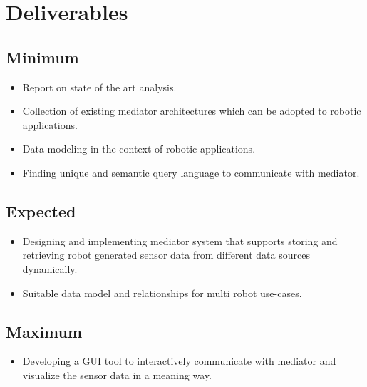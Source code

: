 \documentclass[12pt]{article}
\begin{document}

\newpage
\section{Deliverables}
\subsection{Minimum}
\begin{itemize}
\item Report on state of the art analysis.
\item Collection of existing mediator architectures which can be adopted to robotic applications.
\item Data modeling in the context of robotic applications.
\item Finding unique and semantic query language to communicate with mediator.
\end{itemize}
\subsection{Expected}
\begin{itemize}
\item Designing and implementing mediator system that supports storing and retrieving robot generated sensor data from different data sources dynamically.
\item Suitable data model and relationships for multi robot use-cases.
\end{itemize}
\subsection{Maximum}
\begin{itemize}
\item Developing a GUI tool to interactively communicate with mediator and visualize the sensor data in a meaning way.
\end{itemize}

\newpage



\newpage
\end{document}
